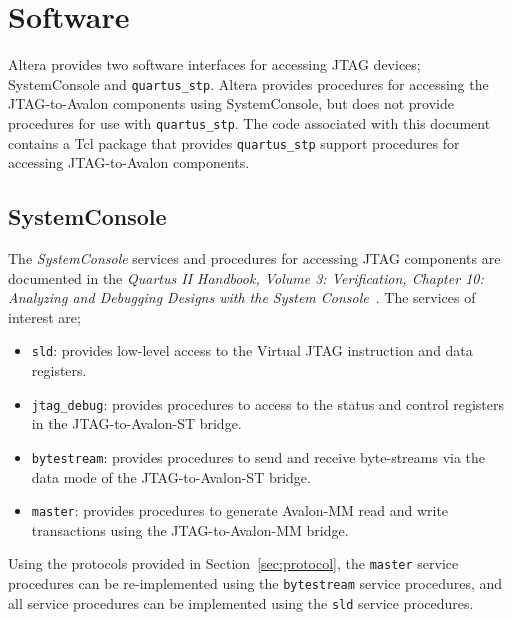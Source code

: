 \documentclass[10pt,twoside]{article}
\begin{document}
\clearpage
\section{Software}
\label{sec:software}

Altera provides two software interfaces for accessing JTAG
devices; SystemConsole and \verb+quartus_stp+. Altera provides
procedures for accessing the JTAG-to-Avalon components
using SystemConsole, but does not provide procedures for
use with \verb+quartus_stp+.
The code associated with this document contains a Tcl package
that provides \verb+quartus_stp+ support procedures for
accessing JTAG-to-Avalon components.

\subsection{SystemConsole}
\label{sec:systemconsole}

The {\em SystemConsole} services and procedures for accessing
JTAG components are documented in the {\em Quartus II Handbook, 
Volume 3: Verification, Chapter 10: Analyzing and Debugging 
Designs with the System Console}~\cite{Altera_Quartus_Handbook_2011}.
The services of interest are;
%
\begin{itemize}
\item \verb+sld+: provides low-level access to the Virtual JTAG
instruction and data registers.
%
\item \verb+jtag_debug+: provides procedures to access to the status and
control registers in the JTAG-to-Avalon-ST bridge.
%
\item \verb+bytestream+: provides procedures to send and
receive byte-streams via the data mode of the JTAG-to-Avalon-ST bridge.
%
\item \verb+master+: provides procedures to generate Avalon-MM
read and write transactions using the JTAG-to-Avalon-MM bridge.
%
\end{itemize}
%
Using the protocols provided in Section~\ref{sec:protocol}, the
\verb+master+ service procedures can be re-implemented using the
\verb+bytestream+ service procedures, and all service procedures
can be implemented using the \verb+sld+ service procedures.

\end{document}
